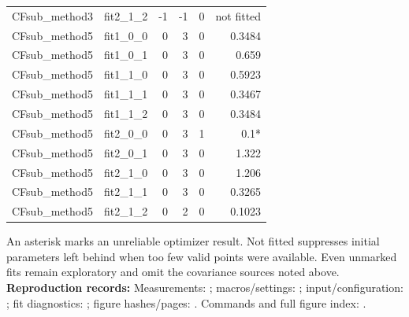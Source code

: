 \documentclass[11pt,a4paper]{article}
\begin{document}
{\begin{longtable}{llrrrr}
CFsub\_method3 & fit2\_1\_2 & -1 & -1 & 0 & not fitted\\
CFsub\_method5 & fit1\_0\_0 & 0 & 3 & 0 & 0.3484\\
CFsub\_method5 & fit1\_0\_1 & 0 & 3 & 0 & 0.659\\
CFsub\_method5 & fit1\_1\_0 & 0 & 3 & 0 & 0.5923\\
CFsub\_method5 & fit1\_1\_1 & 0 & 3 & 0 & 0.3467\\
CFsub\_method5 & fit1\_1\_2 & 0 & 3 & 0 & 0.3484\\
CFsub\_method5 & fit2\_0\_0 & 0 & 3 & 1 & 0.1*\\
CFsub\_method5 & fit2\_0\_1 & 0 & 3 & 0 & 1.322\\
CFsub\_method5 & fit2\_1\_0 & 0 & 3 & 0 & 1.206\\
CFsub\_method5 & fit2\_1\_1 & 0 & 3 & 0 & 0.3265\\
CFsub\_method5 & fit2\_1\_2 & 0 & 2 & 0 & 0.1023\\
\hline\end{longtable}}
An asterisk marks an unreliable optimizer result. Not fitted suppresses initial parameters left behind when too few valid points were available. Even unmarked fits remain exploratory and omit the covariance sources noted above.
{\small\textbf{Reproduction records:} Measurements: ; macros/settings: ; input/configuration: ; fit diagnostics: ; figure hashes/pages: . Commands and full figure index: .}
\end{document}
